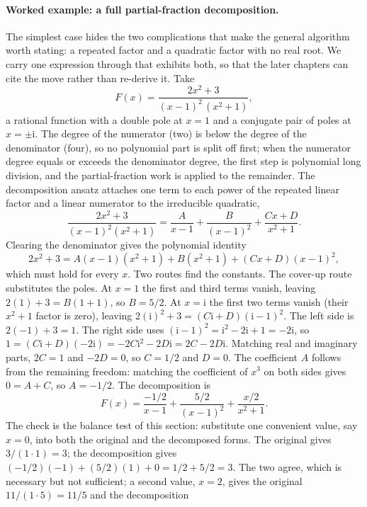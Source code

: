 \paragraph{Worked example: a full partial-fraction decomposition.}
The simplest case hides the two complications that make the general
algorithm worth stating: a repeated factor and a quadratic factor with
no real root. We carry one expression through that exhibits both, so
that the later chapters can cite the move rather than re-derive it. Take
\[
F(x) = \frac{2x^{2} + 3}{(x - 1)^{2}\,(x^{2} + 1)},
\]
a rational function with a double pole at $x = 1$ and a conjugate pair
of poles at $x = \pm \mathrm{i}$. The degree of the numerator (two) is
below the degree of the denominator (four), so no polynomial part is
split off first; when the numerator degree equals or exceeds the
denominator degree, the first step is polynomial long division, and the
partial-fraction work is applied to the remainder. The decomposition
ansatz attaches one term to each power of the repeated linear factor and
a linear numerator to the irreducible quadratic,
\[
\frac{2x^{2} + 3}{(x - 1)^{2}(x^{2} + 1)}
= \frac{A}{x - 1} + \frac{B}{(x - 1)^{2}}
+ \frac{Cx + D}{x^{2} + 1}.
\]
Clearing the denominator gives the polynomial identity
\[
2x^{2} + 3 = A(x - 1)(x^{2} + 1) + B(x^{2} + 1)
+ (Cx + D)(x - 1)^{2},
\]
which must hold for every $x$. Two routes find the constants. The
cover-up route substitutes the poles. At $x = 1$ the first and third
terms vanish, leaving $2(1) + 3 = B(1 + 1)$, so $B = 5/2$. At $x =
\mathrm{i}$ the first two terms vanish (their $x^{2} + 1$ factor is
zero), leaving $2(\mathrm{i})^{2} + 3 = (C\mathrm{i} + D)(\mathrm{i} -
1)^{2}$. The left side is $2(-1) + 3 = 1$. The right side uses
$(\mathrm{i} - 1)^{2} = \mathrm{i}^{2} - 2\mathrm{i} + 1 = -2\mathrm{i}$,
so $1 = (C\mathrm{i} + D)(-2\mathrm{i}) = -2 C \mathrm{i}^{2} - 2 D
\mathrm{i} = 2C - 2D\mathrm{i}$. Matching real and imaginary parts,
$2C = 1$ and $-2D = 0$, so $C = 1/2$ and $D = 0$. The coefficient $A$
follows from the remaining freedom: matching the coefficient of
$x^{3}$ on both sides gives $0 = A + C$, so $A = -1/2$. The
decomposition is
\[
F(x) = \frac{-1/2}{x - 1} + \frac{5/2}{(x - 1)^{2}}
+ \frac{x/2}{x^{2} + 1}.
\]
The check is the balance test of this section: substitute one
convenient value, say $x = 0$, into both the original and the
decomposed forms. The original gives $3/(1 \cdot 1) = 3$; the
decomposition gives $(-1/2)(-1) + (5/2)(1) + 0 = 1/2 + 5/2 = 3$. The
two agree, which is necessary but not sufficient; a second value, $x =
2$, gives the original $11/(1 \cdot 5) = 11/5$ and the decomposition
